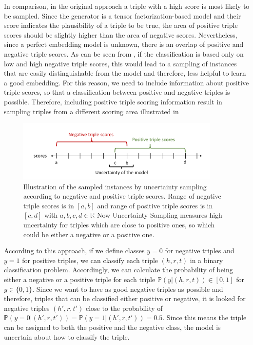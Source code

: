 In comparison, in the original \kbgan approach a triple with a high score is most likely to be sampled.
Since the generator is a tensor factorization-based model and their score indicates the plausibility of a triple to be true, the area of positive triple scores should be slightly higher than the area of negative scores.
Nevertheless, since a perfect embedding model is unknown, there is an overlap of positive and negative triple scores.
As can be seen from , if the classification is based only on low and high negative triple scores, this would lead to a sampling of instances that are easily distinguishable from the model and therefore, less helpful to learn a good embedding.
For this reason, we need to include information about positive triple scores, so that a classification between positive and negative triples is possible.
Therefore, including positive triple scoring information result in sampling triples from a different scoring area illustrated in 
\begin{figure}[H]
  \centering
    \includegraphics[width=0.9\textwidth]{figures/positiveVsNegativeApproach.pdf}
  \caption{Illustration of the sampled instances by uncertainty sampling according to negative and positive triple scores.
  Range of negative triple scores is in $[a, b]$ and range of positive triple scores is in  $[c, d]$ with $a,b,c,d \in \mathbb{R}$
  Now Uncertainty Sampling measures high uncertainty for triples which are close to positive ones, so which could be either a negative or a positive one.}
  \label{fig:positiveVsNegativeApproach}
\end{figure}
According to this approach, if we define classes $y = 0$  for negative triples and $y = 1$ for positive triples, we can classify each triple $(h,r,t)$ in a binary classification problem.
Accordingly, we can calculate the probability of being either a negative or a positive triple for each triple $\mathbb{P}(y| (h,r,t)) \in [0,1]$ for $y \in \{0,1\}$.
Since we want to have as good negative triples as possible and therefore, triples that can be classified either positive or negative, it is looked for negative triples $(h',r,t')$ close to the probability of $\mathbb{P}(y = 0| (h',r,t')) = \mathbb{P}(y = 1| (h',r,t')) = 0.5$.
Since this means the triple can be assigned to both the positive and the negative class, the model is uncertain about how to classify the triple.
\clearpage